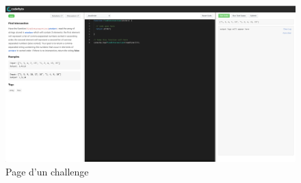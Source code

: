 \begin{figure}[H]
    \includegraphics[width=\textwidth,height=0.35\textheight,keepaspectratio=false]{images/comparison/coderbyte-2.png}
    \centering
    \caption[Coderbyte : page d'un challenge]{Page d'un challenge}
\end{figure}


